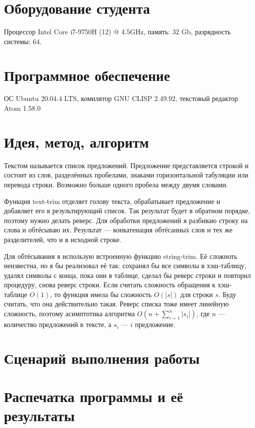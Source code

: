 \documentclass[12pt]{article}
\begin{document}
\section{Оборудование студента}
Процессор Intel Core i7-9750H (12) @ 4.5GHz, память: 32 Gb, разрядность системы: 64.

\section{Программное обеспечение}
ОС Ubuntu 20.04.4 LTS, комилятор GNU CLISP 2.49.92, текстовый редактор Atom 1.58.0

\pagebreak
\section{Идея, метод, алгоритм}
Текстом называется список предложений. Предложение представляется строкой и состоит из слов, разделённых пробелами, знаками горизонтальной табуляции или перевода строки. Возможно больше одного пробела между двумя словами.

Функция text-trim отделяет голову текста, обрабатывает предложение и добавляет его в результирующий список. Так результат будет в обратном порядке, поэтому нужно делать реверс. Для обработки предложений я разбиваю строку на слова и обтёсываю их. Результат --- конкатенация обтёсанных слов и тех же разделителей, что и в исходной строке.

Для обтёсывания я использую встроенную функцию string-trim. Её сложноть неизвестна, но я бы реализовал её так: сохранял бы все символы в хэш-таблицу, удалял символы с конца, пока они в таблице, сделал бы реверс строки и повторил процедуру, снова реверс строки. Если считать сложность обращения к хэш-таблице $O(1)$, то функция имела бы сложность $O(|s|)$ для строки $s$. Буду считать, что она действительно такая. Реверс списка тоже имеет линейную сложность, поэтому асимптотика алгоритма $O(n + \sum_{i=1}^n{|s_i|})$, где $n$ --- количество предложений в тексте, а $s_i$ --- $i$ предложение.

\section{Сценарий выполнения работы}

\section{Распечатка программы и её результаты}
\end{document}
